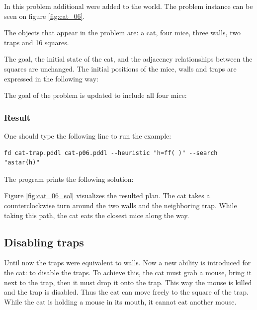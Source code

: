In this problem additional were added to the world. The problem instance can be seen on figure \ref{fig:cat_06}. 

The objects that appear in the problem are: a cat, four mice, three walls, two traps and 16 squares.



The goal, the initial state of the cat, and the adjacency relationships between the squares are unchanged. The initial positions of the mice, walls and traps are expressed in the following way:




The goal of the problem is updated to include all four mice:




\subsubsection{Result}

One should type the following line to run the example: 

\begin{lstlisting}[numbers=none]
fd cat-trap.pddl cat-p06.pddl --heuristic "h=ff( )" --search "astar(h)"
\end{lstlisting}

The program prints the following solution:



Figure \ref{fig:cat_06_sol} visualizes the resulted plan. The cat takes a counterclockwise turn around the two walls and the neighboring trap. While taking this path, the cat eats the closest mice along the way.








\subsection{Disabling traps}

Until now the traps were equivalent to walls. Now a new ability is introduced for the cat: to disable the traps. To achieve this, the cat must grab a mouse, bring it next to the trap, then it must drop it onto the trap. This way the mouse is killed and the trap is disabled. Thus the cat can move freely to the square of the trap. While the cat is holding a mouse in its mouth, it cannot eat another mouse.


